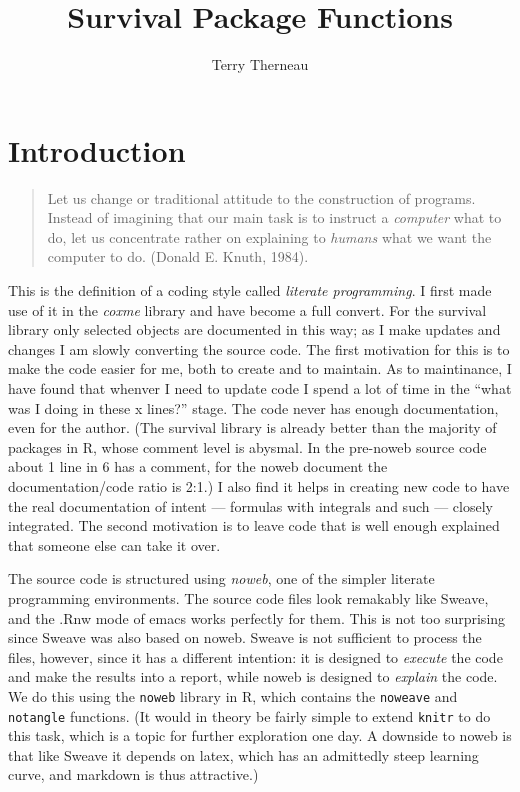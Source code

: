 \documentclass{article}
\title{Survival Package Functions}
\author{Terry Therneau}
\newcommand{\code}[1]{\texttt{#1}}
\begin{document}
\maketitle
\tableofcontents

\section{Introduction}

\begin{quotation}
Let us change or traditional attitude to the construction of programs.
Instead of imagining that our main task is to instruct a \emph{computer}
what to do, let us concentrate rather on explaining to \emph{humans}
what we want the computer to do.  (Donald E. Knuth, 1984).
\end{quotation}

This is the definition of a coding style called 
\emph{literate programming}.
I first made use of it in the \emph{coxme} library and have become a full
convert.  For the survival library only selected objects are documented in
this way;  as I make updates and changes I am slowly converting the source
code. 
The first motivation for this is to make the code easier for me, both to
create and to maintain.  As to maintinance, I have found that whenver I
need to update code I spend a lot of time in the ``what was I doing in these
x lines?'' stage.  The code never has enough documentation, even for the
author.  (The survival library is already better than the majority of packages
in R, whose comment level is abysmal.  
In the pre-noweb source code about 1 line in 6
has a comment, for the noweb document the documentation/code ratio is 2:1.)
I also find it helps in creating new code to have the real documentation of
intent --- formulas with integrals and such --- closely integrated.
The second motivation is to leave code that is well enough explained that
someone else can take it over.

The source code is structured using \emph{noweb}, one of the simpler literate
programming environments.
The source code files look remakably like Sweave, and the .Rnw mode of
emacs works perfectly for them.  This is not too surprising since Sweave
was also based on noweb.  Sweave is not sufficient to process the files,
however, since it has a different intention: it is designed to 
\emph{execute} the code and make the results into a report, while noweb
is designed to \emph{explain} the code.  We do this using the \code{noweb}
library in R, which contains the \code{noweave} and \code{notangle} functions. 
(It would in theory be fairly simple to extend \code{knitr} to do this task,
which is a topic for further exploration one day.  A downside to noweb is
that like Sweave it depends on latex, which has an admittedly steep learning
curve, and markdown is thus attractive.)
\end{document}
